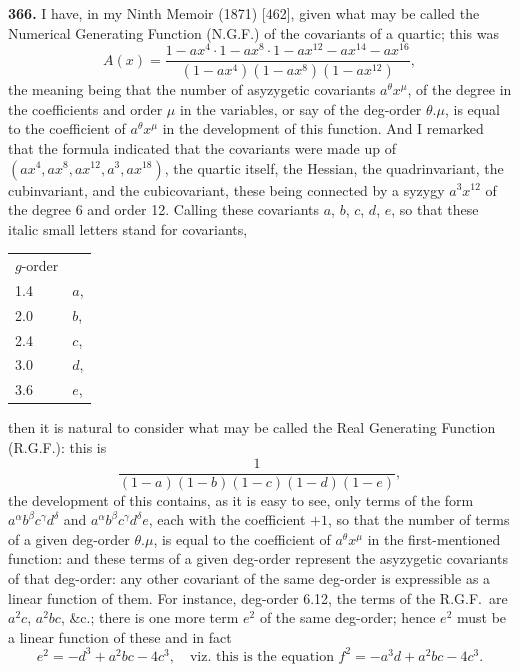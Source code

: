 \documentclass[12pt,a4paper]{article}
\begin{document}
\medskip

\noindent\textbf{366.} I have, in my Ninth Memoir (1871) [462], given what may be called the Numerical Generating Function (N.G.F.) of the covariants of a quartic; this was
\[
A(x) = \frac{1 - ax^4 \cdot 1 - ax^8 \cdot 1 - ax^{12} - ax^{14} - ax^{16}}{(1 - ax^4)(1 - ax^8)(1 - ax^{12})},
\]
the meaning being that the number of asyzygetic covariants $a^\theta x^\mu$, of the degree in the coefficients and order $\mu$ in the variables, or say of the deg-order $\theta.\mu$, is equal to the coefficient of $a^\theta x^\mu$ in the development of this function. And I remarked that the formula indicated that the covariants were made up of $(ax^4, ax^8, ax^{12}, a^3, ax^{18})$, the quartic itself, the Hessian, the quadrinvariant, the cubinvariant, and the cubicovariant, these being connected by a syzygy $a^3 x^{12}$ of the degree 6 and order 12. Calling these covariants $a$, $b$, $c$, $d$, $e$, so that these italic small letters stand for covariants,
\begin{center}
\begin{tabular}{l@{\quad}l}
$g$-order & \\[2pt]
1.4 & $a$, \\
2.0 & $b$, \\
2.4 & $c$, \\
3.0 & $d$, \\
3.6 & $e$,
\end{tabular}
\end{center}
then it is natural to consider what may be called the Real Generating Function (R.G.F.): this is
\[
\frac{1}{(1-a)(1-b)(1-c)(1-d)(1-e)},
\]
the development of this contains, as it is easy to see, only terms of the form $a^\alpha b^\beta c^\gamma d^\delta$ and $a^\alpha b^\beta c^\gamma d^\delta e$, each with the coefficient $+1$, so that the number of terms of a given deg-order $\theta.\mu$, is equal to the coefficient of $a^\theta x^\mu$ in the first-mentioned function: and these terms of a given deg-order represent the asyzygetic covariants of that deg-order: any other covariant of the same deg-order is expressible as a linear function of them. For instance, deg-order 6.12, the terms of the R.G.F.\ are $a^2 c$, $a^2 bc$, \&c.; there is one more term $e^2$ of the same deg-order; hence $e^2$ must be a linear function of these and in fact
\[
e^2 = -d^3 + a^2 bc - 4c^3,\quad\text{viz.\ this is the equation }f^2 = -a^3 d + a^2 bc - 4c^3.
\]
\end{document}
